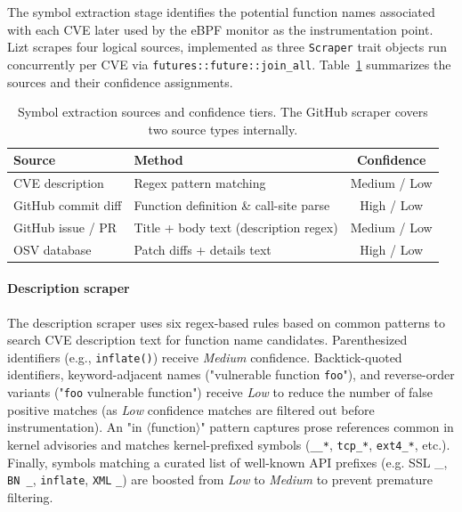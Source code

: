 \documentclass[conference]{IEEEtran}
\begin{document}
The symbol extraction stage identifies the potential function names associated with each CVE later used by the eBPF monitor as the instrumentation point. Lizt scrapes four logical sources, implemented as three \texttt{Scraper} trait objects run concurrently per CVE via \texttt{futures::future::join\_all}. Table~\ref{tab:symbol-sources} summarizes the sources and their confidence assignments.

\begin{table}[h]
  \centering
  \label{tab:symbol-sources}
  \begin{tabular}{llc}
    \toprule
    \textbf{Source}        & \textbf{Method}                        & \textbf{Confidence} \\
    \midrule
    CVE description        & Regex pattern matching                 & Medium / Low        \\
    GitHub commit diff     & Function definition \& call-site parse & High / Low          \\
    GitHub issue / PR      & Title + body text (description regex)  & Medium / Low        \\
    OSV database           & Patch diffs + details text             & High / Low          \\
    \bottomrule
  \end{tabular}
  \caption{Symbol extraction sources and confidence tiers. The GitHub scraper covers two source types internally.}
\end{table}

\paragraph{Description scraper}
The description scraper uses six regex-based rules based on common patterns to search CVE description text for function name candidates. Parenthesized identifiers (e.g., \texttt{inflate()}) receive \textit{Medium} confidence. Backtick-quoted identifiers, keyword-adjacent names ("vulnerable function \texttt{foo}"), and reverse-order variants ("\texttt{foo} vulnerable function") receive \textit{Low} to reduce the number of false positive matches (as \textit{Low} confidence matches are filtered out before instrumentation). An "in $\langle$function$\rangle$" pattern captures prose references common in kernel advisories and matches kernel-prefixed symbols (\texttt{\_\_*}, \texttt{tcp\_*}, \texttt{ext4\_*}, etc.). Finally, symbols matching a curated list of well-known API prefixes (e.g. SSL \_, \texttt{BN \_}, \texttt{inflate}, \texttt{XML} \texttt{\_}) are boosted from \textit{Low} to \textit{Medium} to prevent premature filtering.
\end{document}

